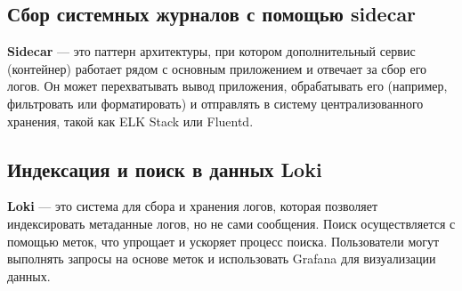 \subsection*{Сбор системных журналов с помощью sidecar}

\textbf{Sidecar} --- это паттерн архитектуры,
при котором дополнительный сервис (контейнер) работает рядом
с основным приложением и отвечает за сбор его логов.
Он может перехватывать вывод приложения, обрабатывать его
(например, фильтровать или форматировать)
и отправлять в систему централизованного хранения,
такой как ELK Stack или Fluentd.

\subsection*{Индексация и поиск в данных Loki}

\textbf{Loki} --- это система для сбора и хранения логов,
которая позволяет индексировать метаданные логов, но не сами сообщения.
Поиск осуществляется с помощью меток, что упрощает и ускоряет процесс поиска.
Пользователи могут выполнять запросы на основе меток
и использовать Grafana для визуализации данных.

